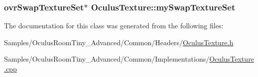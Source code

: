 \subsubsection[{\texorpdfstring{my\+Swap\+Texture\+Set}{mySwapTextureSet}}]{\setlength{\rightskip}{0pt plus 5cm}ovr\+Swap\+Texture\+Set$\ast$ Oculus\+Texture\+::my\+Swap\+Texture\+Set\hspace{0.3cm}{\ttfamily [protected]}}\hypertarget{class_oculus_texture_a04e78e256386bece42e85d2959d2e32f}{}\label{class_oculus_texture_a04e78e256386bece42e85d2959d2e32f}


The documentation for this class was generated from the following files\+:\begin{DoxyCompactItemize}
\item 
Samples/\+Oculus\+Room\+Tiny\+\_\+\+Advanced/\+Common/\+Headers/\hyperlink{_oculus_texture_8h}{Oculus\+Texture.\+h}\item 
Samples/\+Oculus\+Room\+Tiny\+\_\+\+Advanced/\+Common/\+Implementations/\hyperlink{_oculus_texture_8cpp}{Oculus\+Texture.\+cpp}\end{DoxyCompactItemize}
